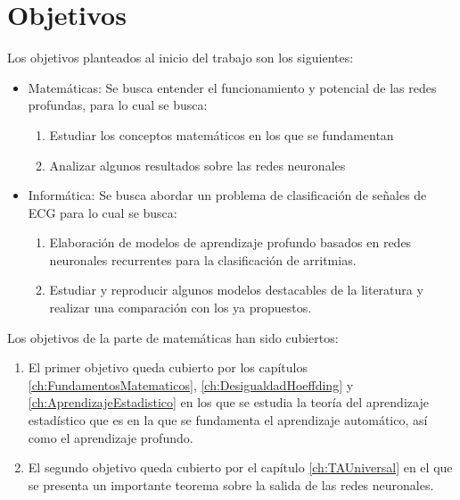 
\setchapterpreamble[c][0.90\linewidth]{%
	\sffamily
  
	\par\bigskip
}

\chapter{Objetivos}\label{ch:objetivos}

    Los objetivos planteados al inicio del trabajo son los siguientes:
    
    \begin{itemize}
        \item Matemáticas: Se busca entender el funcionamiento y potencial de las redes profundas, para lo cual se busca:
            \begin{enumerate}
                \item Estudiar los conceptos matemáticos en los que se fundamentan
                \item Analizar algunos resultados sobre las redes neuronales
            \end{enumerate}
            
        \item Informática: Se busca abordar un problema de clasificación de señales de ECG para lo cual se busca:
            \begin{enumerate}
                \item Elaboración de modelos de aprendizaje profundo basados en redes neuronales recurrentes para la clasificación de arritmias.
                \item Estudiar y reproducir algunos modelos destacables de la literatura y realizar una comparación con los ya propuestos.
            \end{enumerate}
    \end{itemize}

    Los objetivos de la parte de matemáticas han sido cubiertos:
    \begin{enumerate}
        \item El primer objetivo queda cubierto por los capítulos \ref{ch:FundamentosMatematicos}, \ref{ch:DesigualdadHoeffding} y \ref{ch:AprendizajeEstadistico} en los que se estudia la teoría del aprendizaje estadístico que es en la que se fundamenta el aprendizaje automático, así como el aprendizaje profundo.
        \item El segundo objetivo queda cubierto por el capítulo \ref{ch:TAUniversal} en el que se presenta un importante teorema sobre la salida de las redes neuronales.
    \end{enumerate}
    
